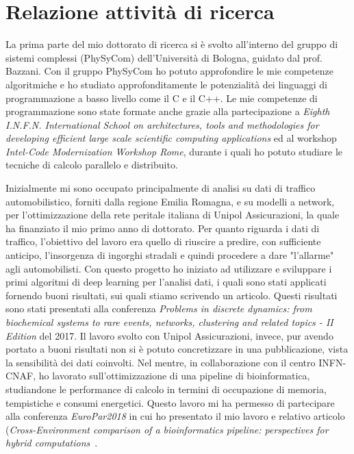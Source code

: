 \documentclass{standalone}
\begin{document}
\chapter*{Relazione attività di ricerca}

La prima parte del mio dottorato di ricerca si è svolto all'interno del gruppo di sistemi complessi (PhySyCom) dell'Università di Bologna, guidato dal prof. Bazzani.
Con il gruppo PhySyCom ho potuto approfondire le mie competenze algoritmiche e ho studiato approfonditamente le potenzialità dei linguaggi di programmazione a basso livello come il C e il C++.
Le mie competenze di programmazione sono state formate anche grazie alla partecipazione a \emph{Eighth I.N.F.N. International School on architectures, tools and methodologies for developing efficient large scale scientific computing applications} ed al workshop \emph{Intel-Code Modernization Workshop Rome}, durante i quali ho potuto studiare le tecniche di calcolo parallelo e distribuito.

Inizialmente mi sono occupato principalmente di analisi su dati di traffico automobilistico, forniti dalla regione Emilia Romagna, e su modelli a network, per l'ottimizzazione della rete peritale italiana di Unipol Assicurazioni, la quale ha finanziato il mio primo anno di dottorato.
Per quanto riguarda i dati di traffico, l'obiettivo del lavoro era quello di riuscire a predire, con sufficiente anticipo, l'insorgenza di ingorghi stradali e quindi procedere a dare "l'allarme" agli automobilisti.
Con questo progetto ho iniziato ad utilizzare e sviluppare i primi algoritmi di deep learning per l'analisi dati, i quali sono stati applicati fornendo buoni risultati, sui quali stiamo scrivendo un articolo.
Questi risultati sono stati presentati alla conferenza \emph{Problems in discrete dynamics: from biochemical systems to rare events, networks, clustering and related topics - II Edition} del 2017.
Il lavoro svolto con Unipol Assicurazioni, invece, pur avendo portato a buoni risultati non si è potuto concretizzare in una pubblicazione, vista la sensibilità dei dati coinvolti.
Nel mentre, in collaborazione con il centro INFN-CNAF, ho lavorato sull'ottimizzazione di una pipeline di bioinformatica, studiandone le performance di calcolo in termini di occupazione di memoria, tempistiche e consumi energetici.
Questo lavoro mi ha permesso di partecipare alla conferenza \emph{EuroPar2018} in cui ho presentato il mio lavoro e relativo articolo (\emph{Cross-Environment comparison of a bioinformatics pipeline: perspectives for hybrid computations}~\cite{EuroPar2018}.
\end{document}
